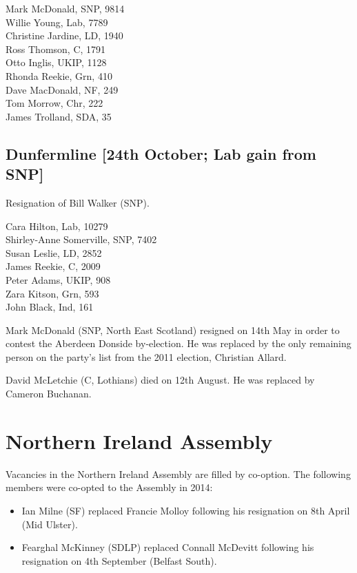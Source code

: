 \documentclass[a4paper,openany,10pt]{book}
\begin{document}
Mark McDonald, SNP, 9814\\
Willie Young, Lab, 7789\\
Christine Jardine, LD, 1940\\
Ross Thomson, C, 1791\\
Otto Inglis, UKIP, 1128\\
Rhonda Reekie, Grn, 410\\
Dave MacDonald, NF, 249\\
Tom Morrow, Chr, 222\\
James Trolland, SDA, 35\\


\subsection*{Dunfermline\hspace*{\fill}\nolinebreak[1]%
\enspace\hspace*{\fill}
[24th October; Lab gain from SNP]}


Resignation of Bill Walker (SNP).



Cara Hilton, Lab, 10279\\
Shirley-Anne Somerville, SNP, 7402\\
Susan Leslie, LD, 2852\\
James Reekie, C, 2009\\
Peter Adams, UKIP, 908\\
Zara Kitson, Grn, 593\\
John Black, Ind, 161\\


\bigskip

Mark McDonald (SNP, North East Scotland) resigned on 14th May in order to contest the Aberdeen Donside by-election.  He was replaced by the only remaining person on the party's list from the 2011 election, Christian Allard.

David McLetchie (C, Lothians) died on 12th August.  He was replaced by Cameron Buchanan.

\section{Northern Ireland Assembly}

Vacancies in the Northern Ireland Assembly are filled by co-option.  
The following members were co-opted to the Assembly in 2014:
\begin{itemize}
\item Ian Milne (SF) replaced Francie Molloy following his resignation on 8th April (Mid Ulster).
\item Fearghal McKinney (SDLP) replaced Connall McDevitt following his resignation on 4th September (Belfast South).
\end{itemize}
\end{document}

